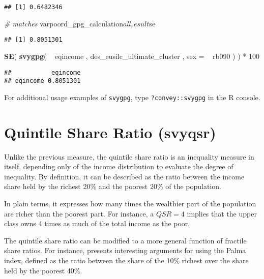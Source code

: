 \documentclass[]{book}
\newenvironment{Shaded}{\begin{snugshade}}{\end{snugshade}}
\newcommand{\KeywordTok}[1]{\textcolor[rgb]{0.13,0.29,0.53}{\textbf{{#1}}}}
\newcommand{\DataTypeTok}[1]{\textcolor[rgb]{0.13,0.29,0.53}{{#1}}}
\newcommand{\DecValTok}[1]{\textcolor[rgb]{0.00,0.00,0.81}{{#1}}}
\newcommand{\StringTok}[1]{\textcolor[rgb]{0.31,0.60,0.02}{{#1}}}
\newcommand{\CommentTok}[1]{\textcolor[rgb]{0.56,0.35,0.01}{\textit{{#1}}}}
\newcommand{\NormalTok}[1]{{#1}}
\begin{document}
\begin{verbatim}
## [1] 0.6482346
\end{verbatim}

\begin{Shaded}
\begin{Highlighting}[]
\CommentTok{# matches}
\NormalTok{varpoord_gpg_calculation$all_result$se}
\end{Highlighting}
\end{Shaded}

\begin{verbatim}
## [1] 0.8051301
\end{verbatim}

\begin{Shaded}
\begin{Highlighting}[]
\KeywordTok{SE}\NormalTok{( }\KeywordTok{svygpg}\NormalTok{( ~}\StringTok{ }\NormalTok{eqincome , des_eusilc_ultimate_cluster , }\DataTypeTok{sex =} \NormalTok{~}\StringTok{ }\NormalTok{rb090 ) ) *}\StringTok{ }\DecValTok{100}
\end{Highlighting}
\end{Shaded}

\begin{verbatim}
##           eqincome
## eqincome 0.8051301
\end{verbatim}

For additional usage examples of \texttt{svygpg}, type
\texttt{?convey::svygpg} in the R console.

\section{Quintile Share Ratio
(svyqsr)}\label{quintile-share-ratio-svyqsr}

Unlike the previous measure, the quintile share ratio is an inequality
measure in itself, depending only of the income distribution to evaluate
the degree of inequality. By definition, it can be described as the
ratio between the income share held by the richest 20\% and the poorest
20\% of the population.

In plain terms, it expresses how many times the wealthier part of the
population are richer than the poorest part. For instance, a \(QSR = 4\)
implies that the upper class owns 4 times as much of the total income as
the poor.

The quintile share ratio can be modified to a more general function of
fractile share ratios. For instance, \citet{cobham2015} presents
interesting arguments for using the Palma index, defined as the ratio
between the share of the 10\% richest over the share held by the poorest
40\%.
\end{document}
